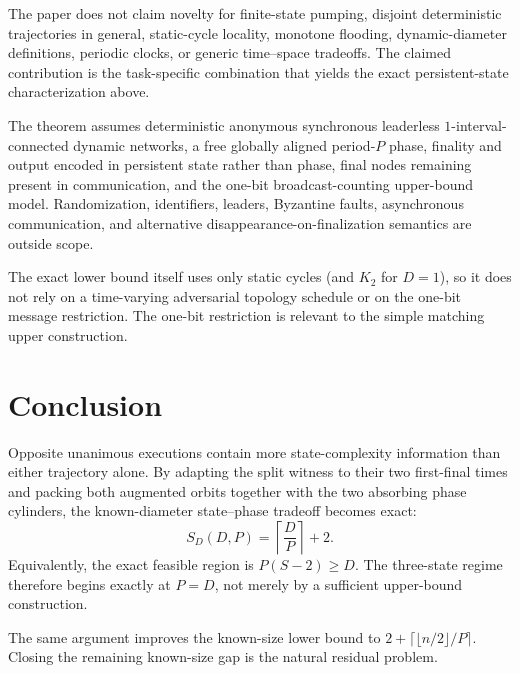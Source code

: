 \documentclass[11pt]{article}
\theoremstyle{remark}
\begin{document}
The paper does not claim novelty for finite-state pumping, disjoint deterministic trajectories in general, static-cycle locality, monotone flooding, dynamic-diameter definitions, periodic clocks, or generic time--space tradeoffs.  The claimed contribution is the task-specific combination that yields the exact persistent-state characterization above.

The theorem assumes deterministic anonymous synchronous leaderless $1$-interval-connected dynamic networks, a free globally aligned period-$P$ phase, finality and output encoded in persistent state rather than phase, final nodes remaining present in communication, and the one-bit broadcast-counting upper-bound model.  Randomization, identifiers, leaders, Byzantine faults, asynchronous communication, and alternative disappearance-on-finalization semantics are outside scope.

The exact lower bound itself uses only static cycles (and $K_2$ for $D=1$), so it does not rely on a time-varying adversarial topology schedule or on the one-bit message restriction.  The one-bit restriction is relevant to the simple matching upper construction.

\section{Conclusion}

Opposite unanimous executions contain more state-complexity information than either trajectory alone.  By adapting the split witness to their two first-final times and packing both augmented orbits together with the two absorbing phase cylinders, the known-diameter state--phase tradeoff becomes exact:
\[
S_D(D,P)=\left\lceil\frac{D}{P}\right\rceil+2.
\]
Equivalently, the exact feasible region is $P(S-2)\ge D$.  The three-state regime therefore begins exactly at $P=D$, not merely by a sufficient upper-bound construction.

The same argument improves the known-size lower bound to $2+\lceil\lfloor n/2\rfloor/P\rceil$.  Closing the remaining known-size gap is the natural residual problem.
\end{document}
